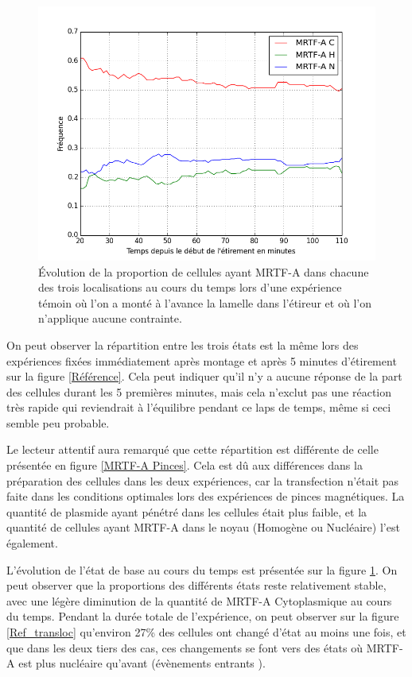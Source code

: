 \begin{figure}
\includegraphics[scale=0.4]{Figures/CHN_vs_Temps_reference.png} 
\caption{\label{Reference_dynamique} \'E{}volution de la proportion de cellules ayant MRTF-A dans chacune des trois localisations au cours du temps lors d'une expérience témoin où l'on a monté à l'avance la lamelle dans l'étireur et où l'on n'applique aucune contrainte.}
\end{figure}

On peut observer la répartition entre les trois états est la même lors des expériences fixées immédiatement après montage et après 5 minutes d'étirement sur la figure \ref{Référence}.
Cela peut indiquer qu'il n'y a aucune réponse de la part des cellules durant les 5 premières minutes, mais cela n'exclut pas une réaction très rapide qui reviendrait à l'équilibre pendant ce laps de temps, même si ceci semble peu probable. 

Le lecteur attentif aura remarqué que cette répartition est différente de celle présentée en figure \ref{MRTF-A Pinces}. 
Cela est dû aux différences dans la préparation des cellules dans les deux expériences, car la transfection n'était pas faite dans les conditions optimales lors des expériences de pinces magnétiques. 
La quantité de plasmide ayant pénétré dans les cellules était plus faible, et la quantité de cellules ayant MRTF-A dans le noyau (Homogène ou Nucléaire) l'est également. 


L'évolution de l'état de base au cours du temps est présentée sur la figure \ref{Reference_dynamique}. On peut observer que la proportions des différents états reste relativement stable, avec une légère diminution de la quantité de MRTF-A Cytoplasmique au cours du temps. 
Pendant la durée totale de l'expérience, on peut observer sur la figure \ref{Ref_transloc} qu'environ 27\% des cellules ont changé d'état au moins une fois, et que dans les deux tiers des cas, ces changements se font vers des états où MRTF-A est plus nucléaire qu'avant (évènements \og entrants \fg). 


